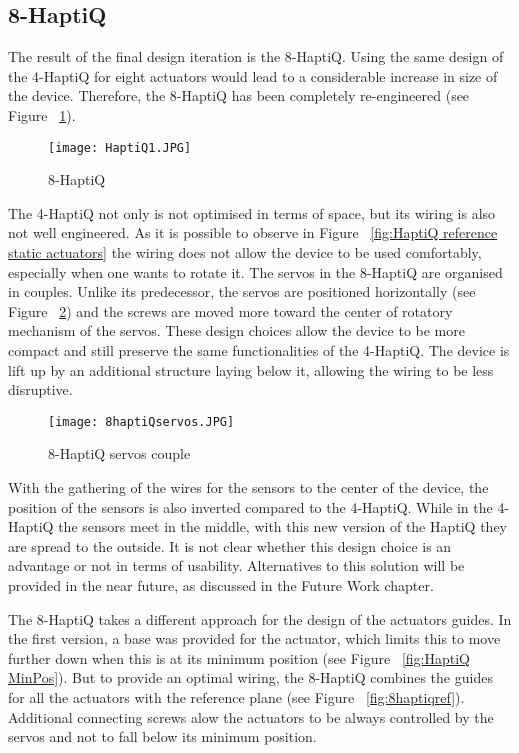 \subsection{8-HaptiQ}
The result of the final design iteration is the 8-HaptiQ. Using the same design of the 4-HaptiQ for eight actuators would lead to a considerable increase in size of the device. Therefore, the 8-HaptiQ has been completely re-engineered (see Figure ~\ref{fig:8-HaptiQ}). 

\begin{figure}[H]
  \centering
  \texttt{[image: HaptiQ1.JPG]}
  \caption{8-HaptiQ}
  \label{fig:8-HaptiQ}
\end{figure}

The 4-HaptiQ not only is not optimised in terms of space, but its wiring is also not well engineered. As it is possible to observe in Figure ~\ref{fig:HaptiQ reference static actuators} the wiring does not allow the device to be used comfortably, especially when one wants to rotate it. 
The servos in the 8-HaptiQ are organised in couples. Unlike its predecessor, the servos are positioned horizontally (see Figure ~\ref{fig:8-HaptiQservos}) and the screws are moved more toward the center of rotatory mechanism of the servos. These design choices allow the device to be more compact and still preserve the same functionalities of the 4-HaptiQ. 
The device is lift up by an additional structure laying below it, allowing the wiring to be less disruptive. 

\begin{figure}[H]
  \centering
  \texttt{[image: 8haptiQservos.JPG]}
  \caption{8-HaptiQ servos couple}
  \label{fig:8-HaptiQservos}
\end{figure}

With the gathering of the wires for the sensors to the center of the device, the position of the sensors is also inverted compared to the 4-HaptiQ. While in the 4-HaptiQ the sensors meet in the middle, with this new version of the HaptiQ they are spread to the outside. It is not clear whether this design choice is an advantage or not in terms of usability. Alternatives to this solution will be provided in the near future, as discussed in the Future Work chapter.

The 8-HaptiQ takes a different approach for the design of the actuators guides. In the first version, a base was provided for the actuator, which limits this to move further down when this is at its minimum position (see Figure ~\ref{fig:HaptiQ MinPos}). But to provide an optimal wiring, the 8-HaptiQ combines the guides for all the actuators with the reference plane (see Figure ~\ref{fig:8haptiqref}). Additional connecting screws alow the actuators to be always controlled by the servos and not to fall below its minimum position. 

